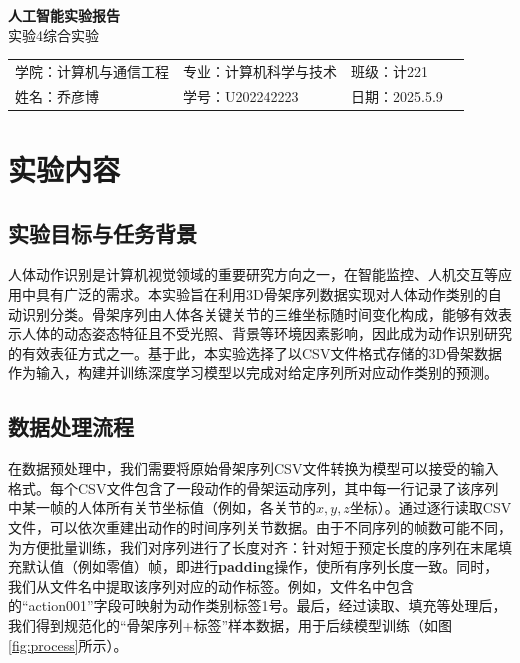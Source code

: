 \documentclass[UTF8]{article}
\begin{document}
\begin{center}
  {\bfseries 人工智能实验报告}\\[1ex]
  { 实验4\quad 综合实验}
\end{center}

\renewcommand{\arraystretch}{1.6}
\begin{tabular}{p{5cm}p{5.5cm}p{3cm}p{5.5cm}}
  学院：计算机与通信工程 & 专业：计算机科学与技术 & 班级：计221\\
  姓名：乔彦博 & 学号：U202242223 & 日期：2025.5.9\\
\end{tabular}

\section{实验内容}

\subsection{实验目标与任务背景}

人体动作识别是计算机视觉领域的重要研究方向之一，在智能监控、人机交互等应用中具有广泛的需求。本实验旨在利用3D骨架序列数据实现对人体动作类别的自动识别分类。骨架序列由人体各关键关节的三维坐标随时间变化构成，能够有效表示人体的动态姿态特征且不受光照、背景等环境因素影响，因此成为动作识别研究的有效表征方式之一。基于此，本实验选择了以CSV文件格式存储的3D骨架数据作为输入，构建并训练深度学习模型以完成对给定序列所对应动作类别的预测。

\subsection{数据处理流程}

在数据预处理中，我们需要将原始骨架序列CSV文件转换为模型可以接受的输入格式。每个CSV文件包含了一段动作的骨架运动序列，其中每一行记录了该序列中某一帧的人体所有关节坐标值（例如，各关节的$x, y, z$坐标）。通过逐行读取CSV文件，可以依次重建出动作的时间序列关节数据。由于不同序列的帧数可能不同，为方便批量训练，我们对序列进行了长度对齐：针对短于预定长度的序列在末尾填充默认值（例如零值）帧，即进行\textbf{padding}操作，使所有序列长度一致。同时，我们从文件名中提取该序列对应的动作标签。例如，文件名中包含的``action001''字段可映射为动作类别标签1号。最后，经过读取、填充等处理后，我们得到规范化的“骨架序列+标签”样本数据，用于后续模型训练（如图\ref{fig:process}所示）。
\end{document}
